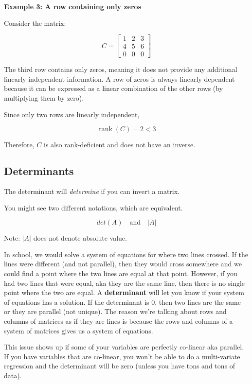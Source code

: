 \documentclass[12pt]{article}
\begin{document}
\textbf{Example 3: A row containing only zeros}

Consider the matrix:

\[
C =
\begin{bmatrix}
1 & 2 & 3 \\
4 & 5 & 6 \\
0 & 0 & 0
\end{bmatrix}
\]

The third row contains only zeros, meaning it does not provide any additional linearly independent information. A row of zeros is always linearly dependent because it can be expressed as a linear combination of the other rows (by multiplying them by zero).

Since only two rows are linearly independent,

\[
\operatorname{rank}(C) = 2 < 3
\]

Therefore, $C$ is also rank-deficient and does not have an inverse.

\subsection{Determinants}

The determinant will \textit{determine} if you can invert a matrix.

You might see two different notations, which are equivalent. 

\[det(A) \quad \text{and} \quad |A|\]

Note: $|A|$ does not denote absolute value.

In school, we would solve a system of equations for where two lines crossed. If the lines were different (and not parallel), then they would cross somewhere and we could find a point where the two lines are equal at that point. However, if you had two lines that were equal, aka they are the same line, then there is no single point where the two are equal. A \textbf{determinant} will let you know if your system of equations has a solution. If the determinant is 0, then two lines are the same or they are parallel (not unique). The reason we're talking about rows and columns of matrices as if they are lines is because the rows and columns of a system of matrices gives us a system of equations.

This issue shows up if some of your variables are perfectly co-linear aka parallel. If you have variables that are co-linear, you won't be able to do a multi-variate regression and the determinant will be zero (unless you have tons and tons of data). 
\end{document}
